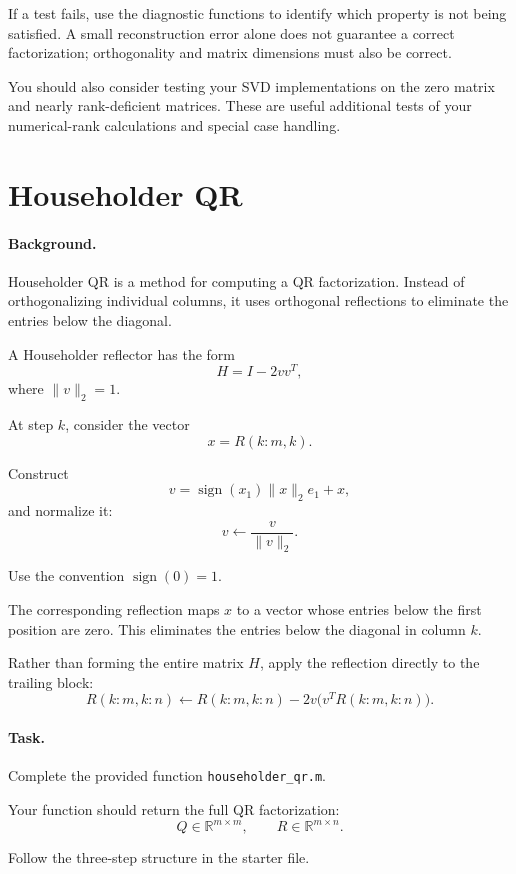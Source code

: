 \documentclass{ximera}
\begin{document}
If a test fails, use the diagnostic functions to identify which
property is not being satisfied. A small reconstruction error alone
does not guarantee a correct factorization; orthogonality and
matrix dimensions must also be correct.

You should also consider testing your SVD implementations on the
zero matrix and nearly rank-deficient matrices. These are useful
additional tests of your numerical-rank calculations and special
case handling.

\section{Householder QR}

\paragraph{Background.}

Householder QR is a method for computing a QR factorization.
Instead of orthogonalizing individual columns, it uses orthogonal
reflections to eliminate the entries below the diagonal.

A Householder reflector has the form
\[
H=I-2vv^T,
\]
where $\|v\|_2=1$.

At step $k$, consider the vector
\[
x=R(k:m,k).
\]

Construct
\[
v=\operatorname{sign}(x_1)\|x\|_2e_1+x,
\]
and normalize it:
\[
v\leftarrow\frac{v}{\|v\|_2}.
\]

Use the convention $\operatorname{sign}(0)=1$.

The corresponding reflection maps $x$ to a vector whose entries
below the first position are zero. This eliminates the entries
below the diagonal in column $k$.

Rather than forming the entire matrix $H$, apply the reflection
directly to the trailing block:
\[
R(k:m,k:n)
\leftarrow
R(k:m,k:n)-2v\bigl(v^TR(k:m,k:n)\bigr).
\]

\paragraph{Task.}

Complete the provided function \texttt{householder\_qr.m}.

Your function should return the full QR factorization:
\[
Q\in\mathbb{R}^{m\times m},
\qquad
R\in\mathbb{R}^{m\times n}.
\]

Follow the three-step structure in the starter file.
\end{document}
